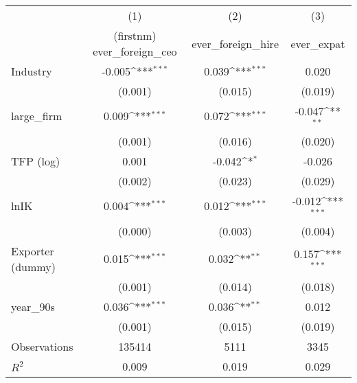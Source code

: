 {
\def\sym#1{\ifmmode^{#1}\else\(^{#1}\)\fi}
\begin{tabular}{l*{3}{c}}
\hline\hline
                    &\multicolumn{1}{c}{(1)}&\multicolumn{1}{c}{(2)}&\multicolumn{1}{c}{(3)}\\
                    &\multicolumn{1}{c}{(firstnm) ever\_foreign\_ceo}&\multicolumn{1}{c}{ever\_foreign\_hire}&\multicolumn{1}{c}{ever\_expat}\\
\hline
Industry            &      -0.005\sym{***}&       0.039\sym{***}&       0.020         \\
                    &     (0.001)         &     (0.015)         &     (0.019)         \\
[1em]
large\_firm          &       0.009\sym{***}&       0.072\sym{***}&      -0.047\sym{**} \\
                    &     (0.001)         &     (0.016)         &     (0.020)         \\
[1em]
TFP (log)           &       0.001         &      -0.042\sym{*}  &      -0.026         \\
                    &     (0.002)         &     (0.023)         &     (0.029)         \\
[1em]
lnIK                &       0.004\sym{***}&       0.012\sym{***}&      -0.012\sym{***}\\
                    &     (0.000)         &     (0.003)         &     (0.004)         \\
[1em]
Exporter (dummy)    &       0.015\sym{***}&       0.032\sym{**} &       0.157\sym{***}\\
                    &     (0.001)         &     (0.014)         &     (0.018)         \\
[1em]
year\_90s            &       0.036\sym{***}&       0.036\sym{**} &       0.012         \\
                    &     (0.001)         &     (0.015)         &     (0.019)         \\
\hline
Observations        &      135414         &        5111         &        3345         \\
\(R^{2}\)           &       0.009         &       0.019         &       0.029         \\
\hline\hline
\end{tabular}
}

